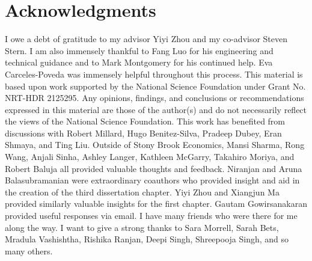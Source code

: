\clearpage
\chapter*{Acknowledgments}

I owe a debt of gratitude to my advisor Yiyi Zhou and my co-advisor Steven Stern. I am also immensely thankful to Fang Luo for his engineering and technical guidance and to Mark Montgomery for his continued help. Eva Carceles-Poveda was immensely helpful throughout this process. This material is based upon work supported by the National Science Foundation under Grant No. NRT-HDR 2125295. Any opinions, findings, and conclusions or recommendations expressed in this material are those of the author(s) and do not necessarily reflect the views of the National Science Foundation. This work has benefited from discussions with Robert Millard, Hugo Benitez-Silva, Pradeep Dubey, Eran Shmaya, and Ting Liu. Outside of Stony Brook Economics, Mansi Sharma, Rong Wang, Anjali Sinha, Ashley Langer, Kathleen McGarry, Takahiro Moriya, and Robert Baluja all provided valuable thoughts and feedback. Niranjan and Aruna Balasubramanian were extraordinary coauthors who provided insight and aid in the creation of the third dissertation chapter. Yiyi Zhou and Xiangjun Ma provided similarly valuable insights for the first chapter. Gautam Gowirsanakaran provided useful responses via email. I have many friends who were there for me along the way. I want to give a strong thanks to Sara Morrell, Sarah Bets, Mradula Vashishtha, Rishika Ranjan, Deepi Singh, Shreepooja Singh, and so many others.

\clearpage
